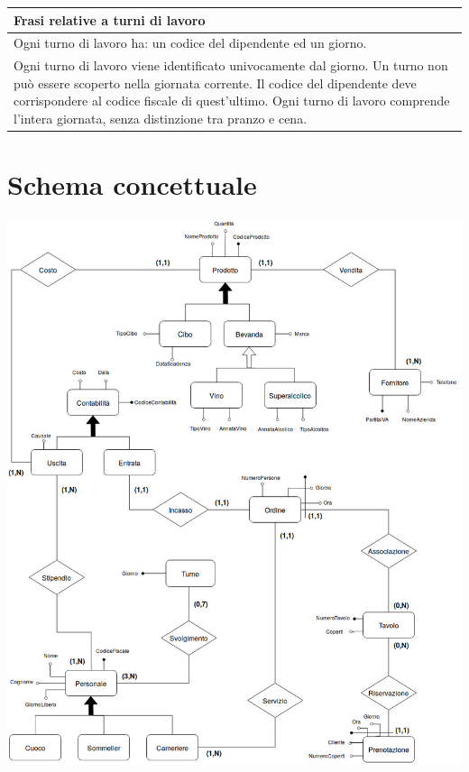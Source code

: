 \begin{longtable}{|p{15.5cm}|}
    \hline
    \textbf{Frasi relative a turni di lavoro} \\ \hline
    Ogni turno di lavoro ha: un codice del dipendente ed un giorno. \\
    Ogni turno di lavoro viene identificato univocamente dal giorno.
    Un turno non può essere scoperto nella giornata corrente.
    Il codice del dipendente deve corrispondere al codice fiscale di quest’ultimo.
    Ogni turno di lavoro comprende l’intera giornata, senza distinzione tra pranzo e cena.
    \\ \hline
\end{longtable}


\section{Schema concettuale} %
\includegraphics[width=1\textwidth]{doc/schema}
